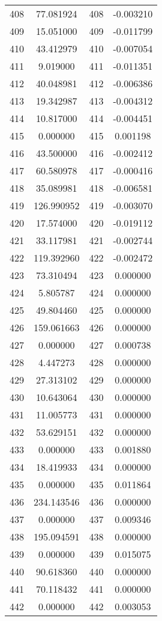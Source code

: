 \documentclass[12pt]{article}
\begin{document}
\begin{longtable}{@{}cccc@{}}
408 & 77.081924 & 408 & -0.003210 \\
409 & 15.051000 & 409 & -0.011799 \\
410 & 43.412979 & 410 & -0.007054 \\
411 & 9.019000 & 411 & -0.011351 \\
412 & 40.048981 & 412 & -0.006386 \\
413 & 19.342987 & 413 & -0.004312 \\
414 & 10.817000 & 414 & -0.004451 \\
415 & 0.000000 & 415 & 0.001198 \\
416 & 43.500000 & 416 & -0.002412 \\
417 & 60.580978 & 417 & -0.000416 \\
418 & 35.089981 & 418 & -0.006581 \\
419 & 126.990952 & 419 & -0.003070 \\
420 & 17.574000 & 420 & -0.019112 \\
421 & 33.117981 & 421 & -0.002744 \\
422 & 119.392960 & 422 & -0.002472 \\
423 & 73.310494 & 423 & 0.000000 \\
424 & 5.805787 & 424 & 0.000000 \\
425 & 49.804460 & 425 & 0.000000 \\
426 & 159.061663 & 426 & 0.000000 \\
427 & 0.000000 & 427 & 0.000738 \\
428 & 4.447273 & 428 & 0.000000 \\
429 & 27.313102 & 429 & 0.000000 \\
430 & 10.643064 & 430 & 0.000000 \\
431 & 11.005773 & 431 & 0.000000 \\
432 & 53.629151 & 432 & 0.000000 \\
433 & 0.000000 & 433 & 0.001880 \\
434 & 18.419933 & 434 & 0.000000 \\
435 & 0.000000 & 435 & 0.011864 \\
436 & 234.143546 & 436 & 0.000000 \\
437 & 0.000000 & 437 & 0.009346 \\
438 & 195.094591 & 438 & 0.000000 \\
439 & 0.000000 & 439 & 0.015075 \\
440 & 90.618360 & 440 & 0.000000 \\
441 & 70.118432 & 441 & 0.000000 \\
442 & 0.000000 & 442 & 0.003053 \\

\end{longtable}
\end{document}
